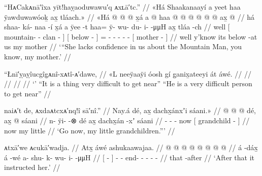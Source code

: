 \ex\label{ex:92-87-mom-lacks-confidence}%
%
\begingl
	\glpreamble	“HᴀCakᴀnā′îxa yīt!haỵaoduwawu′q ᴀxʟā′tc.” //
	\glpreamble	«\!Há Shaakanaayí a yeet haa ÿawduwawóoḵ ax̱ tláach.\!» //
	\gla	«\!Há {}  @ {} @ {} @ {} {} x̱á
		{} a  @ {} {}
		haa @  @ {} @ {} @ {} @ {} @ {}
		{} ax̱  @ {} {} //
	\glb	\pqp{}há {} shaa- ká- naa -í {} x̱á
		{} a ÿee -t {}
		haa= ÿ- wu- du- i-  -μμH
		{} ax̱ tláa -ch {} //
	\glc	\pqp{}well {}[ mountain- - clan - {}] 
		{}[  below - {}]
		= - - - -
			 -
		{}[  mother - {}] //
	\gld	\pqp{}well {}  {} {} {} {} y’know
		{} its below -at {}
		us  {} {} {} {} {}
		{} my mother {} {} //
	\glft	‘“She lacks confidence in us about the Mountain Man, you know, my mother.’
		//
\endgl
\xe

\ex\label{ex:92-88-}%
%
\begingl
	\glpreamble	“Łnī′ỵaỵîucgîg̣ᴀnî-xᴀtî-ᴀ′dawe, //
	\glpreamble	«\!L neeÿaaÿi óosh gí g̱anix̱ateeyi át áwé. //
	\gla	 //
	\glb	 //
	\glc	 //
	\gld	 //
	\glft	‘’\newline
		“It is a thing very difficult to get near”\newline
		“He is a very difficult person to get near”
		//
\endgl
\xe


\ex\label{ex:92-89-go-now-grandchildren}%
%
\begingl
	\glpreamble	naiᴀ′t de, ᴀxdaᴀtcxᴀ′nq!î sā′nî.” //
	\glpreamble	Nay.á dé, ax̱ dachx̱ánxʼi sáani.\!» //
	\gla	{} @ {} @ {} @ {} dé,
		{} ax̱  @ {} sáani {} //
	\glb	n- ÿi-  -⊗ dé
		{} ax̱ dachx̱án -xʼ sáani {} //
	\glc	{}- -  - now
		{}[  grandchild -  {}] //
	\gld	{} {} {} {} now
		{} my  {} little {} //
	\glft	‘Go now, my little grandchildren.”’
		//
\endgl
\xe

\ex\label{ex:92-90-she-instructed-her}%
%
\begingl
	\glpreamble	ᴀtxā′we ᴀcukā′wadja. //
	\glpreamble	Atx̱ áwé ashukaawajaa. //
	\gla	{}  @ {} {}  @ {}
		 @ {} @ {} @ {} @ {} @ {} @ {} //
	\glb	{} á -dáx̱ {} á -wé
		a- shu- k- wu- i-  -μμH //
	\glc	{}[  - {}]  -
		- end- - - -  - //
	\gld	{} that -after {}  {}
		 {} {} {} {} {} {} //
	\glft	‘After that it instructed her.’
		//
\endgl
\xe

